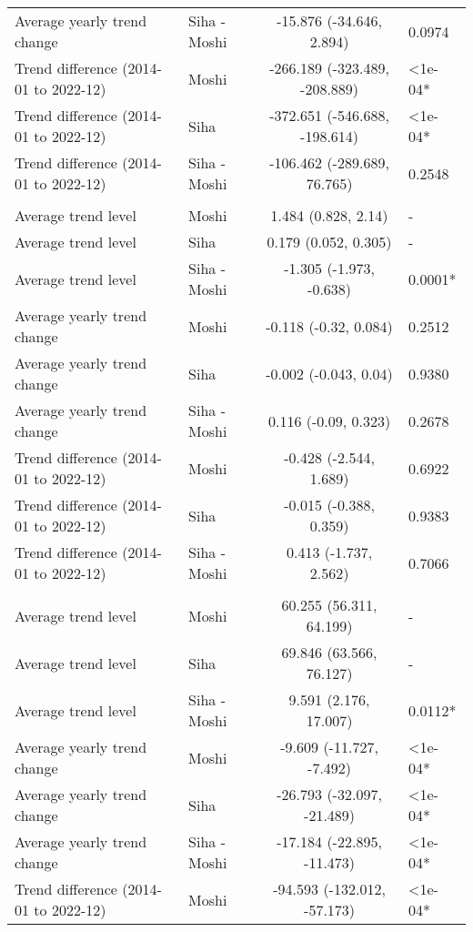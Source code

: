 \begin{longtable}{l|lcl}
Average yearly trend change & Siha - Moshi & -15.876 (-34.646, 2.894) & 0.0974 \\ 
Trend difference (2014-01 to 2022-12) & Moshi & -266.189 (-323.489, -208.889) & <1e-04* \\ 
Trend difference (2014-01 to 2022-12) & Siha & -372.651 (-546.688, -198.614) & <1e-04* \\ 
Trend difference (2014-01 to 2022-12) & Siha - Moshi & -106.462 (-289.689, 76.765) & 0.2548 \\ 
\midrule\addlinespace[2.5pt]
\multicolumn{4}{l}{Leprosy} \\[2.5pt] 
\midrule\addlinespace[2.5pt]
Average trend level & Moshi & 1.484 (0.828, 2.14) & - \\ 
Average trend level & Siha & 0.179 (0.052, 0.305) & - \\ 
Average trend level & Siha - Moshi & -1.305 (-1.973, -0.638) & 0.0001* \\ 
Average yearly trend change & Moshi & -0.118 (-0.32, 0.084) & 0.2512 \\ 
Average yearly trend change & Siha & -0.002 (-0.043, 0.04) & 0.9380 \\ 
Average yearly trend change & Siha - Moshi & 0.116 (-0.09, 0.323) & 0.2678 \\ 
Trend difference (2014-01 to 2022-12) & Moshi & -0.428 (-2.544, 1.689) & 0.6922 \\ 
Trend difference (2014-01 to 2022-12) & Siha & -0.015 (-0.388, 0.359) & 0.9383 \\ 
Trend difference (2014-01 to 2022-12) & Siha - Moshi & 0.413 (-1.737, 2.562) & 0.7066 \\ 
\midrule\addlinespace[2.5pt]
\multicolumn{4}{l}{Malaria} \\[2.5pt] 
\midrule\addlinespace[2.5pt]
Average trend level & Moshi & 60.255 (56.311, 64.199) & - \\ 
Average trend level & Siha & 69.846 (63.566, 76.127) & - \\ 
Average trend level & Siha - Moshi & 9.591 (2.176, 17.007) & 0.0112* \\ 
Average yearly trend change & Moshi & -9.609 (-11.727, -7.492) & <1e-04* \\ 
Average yearly trend change & Siha & -26.793 (-32.097, -21.489) & <1e-04* \\ 
Average yearly trend change & Siha - Moshi & -17.184 (-22.895, -11.473) & <1e-04* \\ 
Trend difference (2014-01 to 2022-12) & Moshi & -94.593 (-132.012, -57.173) & <1e-04* \\ 

\end{longtable}
